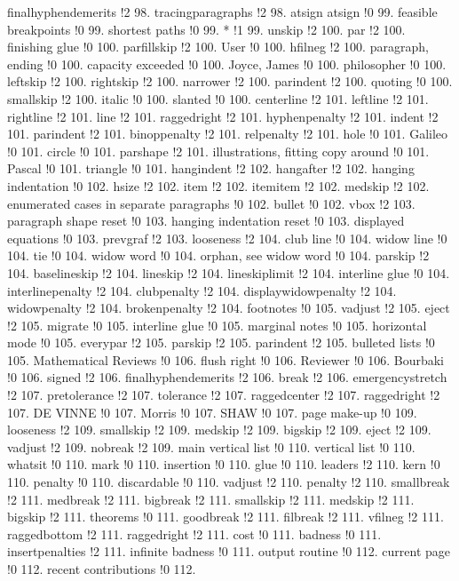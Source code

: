 finalhyphendemerits !2 98.
tracingparagraphs !2 98.
atsign atsign !0 99.
feasible breakpoints !0 99.
shortest paths !0 99.
* !1 99.
unskip !2 100.
par !2 100.
finishing glue !0 100.
parfillskip !2 100.
User !0 100.
hfilneg !2 100.
paragraph, ending !0 100.
capacity exceeded !0 100.
Joyce, James !0 100.
philosopher !0 100.
leftskip !2 100.
rightskip !2 100.
narrower !2 100.
parindent !2 100.
quoting !0 100.
smallskip !2 100.
italic !0 100.
slanted !0 100.
centerline !2 101.
leftline !2 101.
rightline !2 101.
line !2 101.
raggedright !2 101.
hyphenpenalty !2 101.
indent !2 101.
parindent !2 101.
binoppenalty !2 101.
relpenalty !2 101.
hole !0 101.
Galileo !0 101.
circle !0 101.
parshape !2 101.
illustrations, fitting copy around !0 101.
Pascal !0 101.
triangle !0 101.
hangindent !2 102.
hangafter !2 102.
hanging indentation !0 102.
hsize !2 102.
item !2 102.
itemitem !2 102.
medskip !2 102.
enumerated cases in separate paragraphs !0 102.
bullet !0 102.
vbox !2 103.
paragraph shape reset !0 103.
hanging indentation reset !0 103.
displayed equations !0 103.
prevgraf !2 103.
looseness !2 104.
club line !0 104.
widow line !0 104.
tie !0 104.
widow word !0 104.
orphan, see widow word !0 104.
parskip !2 104.
baselineskip !2 104.
lineskip !2 104.
lineskiplimit !2 104.
interline glue !0 104.
interlinepenalty !2 104.
clubpenalty !2 104.
displaywidowpenalty !2 104.
widowpenalty !2 104.
brokenpenalty !2 104.
footnotes !0 105.
vadjust !2 105.
eject !2 105.
migrate !0 105.
interline glue !0 105.
marginal notes !0 105.
horizontal mode !0 105.
everypar !2 105.
parskip !2 105.
parindent !2 105.
bulleted lists !0 105.
Mathematical Reviews !0 106.
flush right !0 106.
Reviewer !0 106.
Bourbaki !0 106.
signed !2 106.
finalhyphendemerits !2 106.
break !2 106.
emergencystretch !2 107.
pretolerance !2 107.
tolerance !2 107.
raggedcenter !2 107.
raggedright !2 107.
DE VINNE !0 107.
Morris !0 107.
SHAW !0 107.
page make-up !0 109.
looseness !2 109.
smallskip !2 109.
medskip !2 109.
bigskip !2 109.
eject !2 109.
vadjust !2 109.
nobreak !2 109.
main vertical list !0 110.
vertical list !0 110.
whatsit !0 110.
mark !0 110.
insertion !0 110.
glue !0 110.
leaders !2 110.
kern !0 110.
penalty !0 110.
discardable !0 110.
vadjust !2 110.
penalty !2 110.
smallbreak !2 111.
medbreak !2 111.
bigbreak !2 111.
smallskip !2 111.
medskip !2 111.
bigskip !2 111.
theorems !0 111.
goodbreak !2 111.
filbreak !2 111.
vfilneg !2 111.
raggedbottom !2 111.
raggedright !2 111.
cost !0 111.
badness !0 111.
insertpenalties !2 111.
infinite badness !0 111.
output routine !0 112.
current page !0 112.
recent contributions !0 112.
